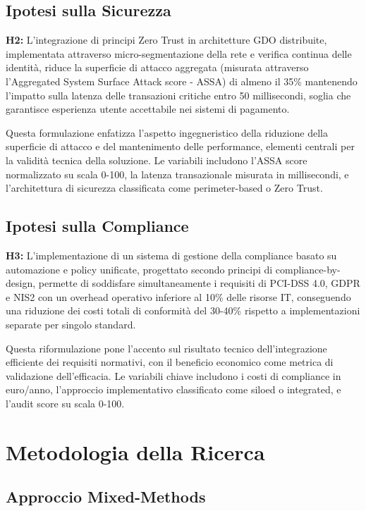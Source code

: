 \subsection{Ipotesi sulla Sicurezza}

\textbf{H2:} L'integrazione di principi Zero Trust in architetture GDO distribuite, implementata attraverso micro-segmentazione della rete e verifica continua delle identità, riduce la superficie di attacco aggregata (misurata attraverso l'Aggregated System Surface Attack score - ASSA) di almeno il 35\% mantenendo l'impatto sulla latenza delle transazioni critiche entro 50 millisecondi, soglia che garantisce esperienza utente accettabile nei sistemi di pagamento.

Questa formulazione enfatizza l'aspetto ingegneristico della riduzione della superficie di attacco e del mantenimento delle performance, elementi centrali per la validità tecnica della soluzione. Le variabili includono l'ASSA score normalizzato su scala 0-100, la latenza transazionale misurata in millisecondi, e l'architettura di sicurezza classificata come perimeter-based o Zero Trust.

\subsection{Ipotesi sulla Compliance}

\textbf{H3:} L'implementazione di un sistema di gestione della compliance basato su automazione e policy unificate, progettato secondo principi di compliance-by-design, permette di soddisfare simultaneamente i requisiti di PCI-DSS 4.0, GDPR e NIS2 con un overhead operativo inferiore al 10\% delle risorse IT, conseguendo una riduzione dei costi totali di conformità del 30-40\% rispetto a implementazioni separate per singolo standard.

Questa riformulazione pone l'accento sul risultato tecnico dell'integrazione efficiente dei requisiti normativi, con il beneficio economico come metrica di validazione dell'efficacia. Le variabili chiave includono i costi di compliance in euro/anno, l'approccio implementativo classificato come siloed o integrated, e l'audit score su scala 0-100.

\section{Metodologia della Ricerca}

\subsection{Approccio Mixed-Methods}

